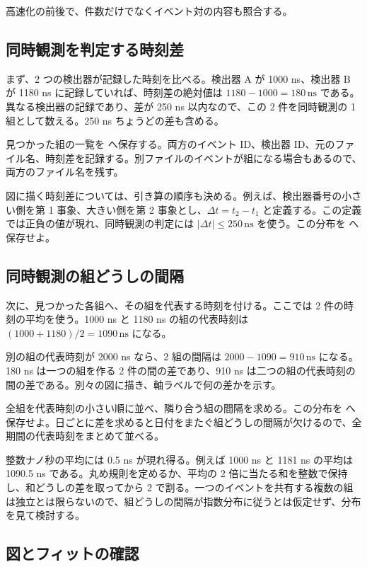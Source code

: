 高速化の前後で、件数だけでなくイベント対の内容も照合する。

\subsection{同時観測を判定する時刻差}

まず、2 つの検出器が記録した時刻を比べる。検出器 A が 1000 ns、検出器 B が 1180 ns に記録していれば、時刻差の絶対値は \(1180-1000=180\,\mathrm{ns}\) である。異なる検出器の記録であり、差が 250 ns 以内なので、この 2 件を同時観測の 1 組として数える。250 ns ちょうどの差も含める。

見つかった組の一覧を  へ保存する。両方のイベント ID、検出器 ID、元のファイル名、時刻差を記録する。別ファイルのイベントが組になる場合もあるので、両方のファイル名を残す。

図に描く時刻差については、引き算の順序も決める。例えば、検出器番号の小さい側を第 1 事象、大きい側を第 2 事象とし、\(\Delta t=t_2-t_1\) と定義する。この定義では正負の値が現れ、同時観測の判定には \(\lvert\Delta t\rvert\leq250\,\mathrm{ns}\) を使う。この分布を  へ保存せよ。

\subsection{同時観測の組どうしの間隔}

次に、見つかった各組へ、その組を代表する時刻を付ける。ここでは 2 件の時刻の平均を使う。1000 ns と 1180 ns の組の代表時刻は \((1000+1180)/2=1090\,\mathrm{ns}\) になる。

別の組の代表時刻が 2000 ns なら、2 組の間隔は \(2000-1090=910\,\mathrm{ns}\) になる。180 ns は一つの組を作る 2 件の間の差であり、910 ns は二つの組の代表時刻の間の差である。別々の図に描き、軸ラベルで何の差かを示す。

全組を代表時刻の小さい順に並べ、隣り合う組の間隔を求める。この分布を  へ保存せよ。日ごとに差を求めると日付をまたぐ組どうしの間隔が欠けるので、全期間の代表時刻をまとめて並べる。

整数ナノ秒の平均には 0.5 ns が現れ得る。例えば 1000 ns と 1181 ns の平均は 1090.5 ns である。丸め規則を定めるか、平均の 2 倍に当たる和を整数で保持し、和どうしの差を取ってから 2 で割る。一つのイベントを共有する複数の組は独立とは限らないので、組どうしの間隔が指数分布に従うとは仮定せず、分布を見て検討する。

\subsection{図とフィットの確認}

